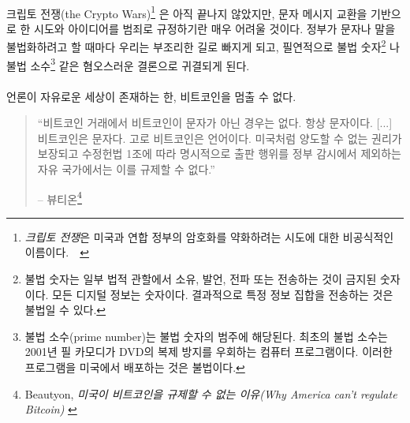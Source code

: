\paragraph{}
크립토 전쟁(the Crypto Wars)\footnote{\textit{크립토 전쟁}은 미국과 연합 정부의 암호화를 약화하려는 시도에 대한 비공식적인 이름이다.~\cite{eff-cryptowars}~\cite{wiki:cryptowars}} 
은 아직 끝나지 않았지만, 문자 메시지 교환을 기반으로 한 시도와 아이디어를 범죄로 규정하기란 매우 어려울 것이다.
정부가 문자나 말을 불법화하려고 할 때마다 우리는 부조리한 길로 빠지게 되고, 필연적으로 
불법 숫자\footnote{불법 숫자는 일부 법적 관할에서 소유, 발언, 전파 또는 전송하는 것이 금지된 숫자이다. 모든 디지털 정보는 숫자이다.	결과적으로 특정 정보 집합을 전송하는 것은 불법일 수 있다.\cite{wiki:illegal-number}}
나 불법 소수\footnote{불법 소수(prime number)는 불법 숫자의 범주에 해당된다. 최초의 불법 소수는 2001년 필 카모디가 DVD의 복제 방지를 우회하는 컴퓨터 프로그램이다. 이러한 프로그램을 미국에서 배포하는 것은 불법이다.\cite{wiki:illegal-prime}}
 같은 혐오스러운 결론으로 귀결되게 된다.

\paragraph{}
언론이 자유로운 세상이 존재하는 한, 비트코인을 멈출 수 없다.

\begin{quotation}\begin{samepage}
		\enquote{비트코인 거래에서 비트코인이 문자가 아닌 경우는 없다. 항상 문자이다. [...]
			비트코인은 문자다. 고로 비트코인은 언어이다.
			미국처럼 양도할 수 없는 권리가 보장되고 수정헌법 1조에 따라 
			명시적으로 출판 행위를 정부 감시에서 제외하는 자유 국가에서는 이를 규제할 수 없다.}
		\begin{flushright} -- 뷰티온\footnote{Beautyon, \textit{미국이 비트코인을 규제할 수 없는 이유(Why America can't regulate Bitcoin)} \cite{america-regulate-bitcoin}}
\end{flushright}\end{samepage}\end{quotation}

